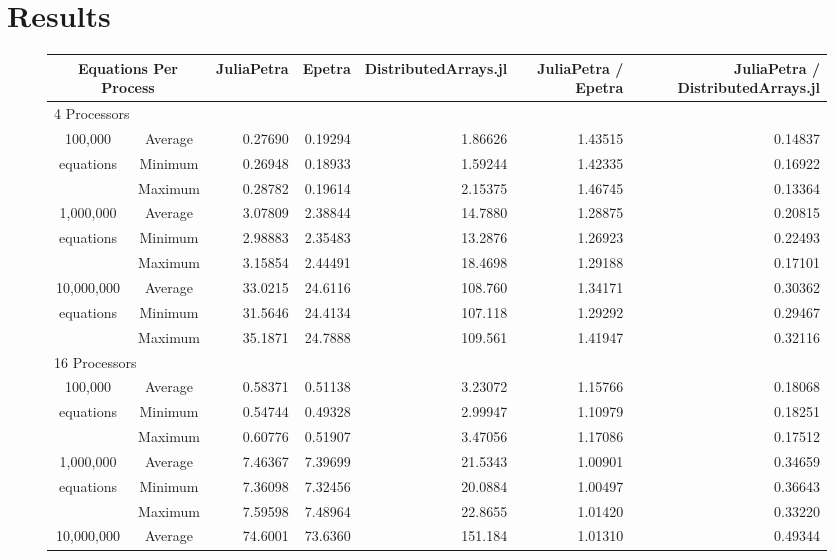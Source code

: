 \documentclass[acmsmall]{acmart}
\begin{document}
\section{Results}

\begin{figure}
\begin{tabular}{|c c|r|r|r||r|r|}
	\hline
		\multicolumn{2}{|c|}{Equations Per Process}
		& JuliaPetra
		& Epetra
		& \multicolumn{1}{m{1.8cm}||}{Distributed\-Arrays.jl}
		& \multicolumn{1}{m{1.75cm}|}{JuliaPetra / Epetra}
		& \multicolumn{1}{m{1.8cm}|}{JuliaPetra / Distributed\-Arrays.jl} \\
	\hline
		\multicolumn{7}{|l|}{4 Processors}\\
	\hline
		100,000			&Average & 0.27690 & 0.19294 & 1.86626 & 1.43515 & 0.14837 \\
		equations		&Minimum & 0.26948 & 0.18933 & 1.59244 & 1.42335 & 0.16922 \\
						&Maximum & 0.28782 & 0.19614 & 2.15375 & 1.46745 & 0.13364 \\
	\hline
		1,000,000		&Average & 3.07809 & 2.38844 & 14.7880 & 1.28875 & 0.20815 \\
		equations		&Minimum & 2.98883 & 2.35483 & 13.2876 & 1.26923 & 0.22493 \\
						&Maximum & 3.15854 & 2.44491 & 18.4698 & 1.29188 & 0.17101 \\
	\hline
		10,000,000		&Average & 33.0215 & 24.6116 & 108.760 & 1.34171 & 0.30362 \\
		equations		&Minimum & 31.5646 & 24.4134 & 107.118 & 1.29292 & 0.29467 \\
						&Maximum & 35.1871 & 24.7888 & 109.561 & 1.41947 & 0.32116 \\
	\hline
		\multicolumn{7}{|l|}{16 Processors}\\
	\hline
		100,000			&Average & 0.58371 & 0.51138 & 3.23072 & 1.15766 & 0.18068 \\
		equations		&Minimum & 0.54744 & 0.49328 & 2.99947 & 1.10979 & 0.18251 \\
						&Maximum & 0.60776 & 0.51907 & 3.47056 & 1.17086 & 0.17512 \\
	\hline
		1,000,000		&Average & 7.46367 & 7.39699 & 21.5343 & 1.00901 & 0.34659 \\
		equations		&Minimum & 7.36098 & 7.32456 & 20.0884 & 1.00497 & 0.36643 \\
						&Maximum & 7.59598 & 7.48964 & 22.8655 & 1.01420 & 0.33220 \\
	\hline
		10,000,000		&Average & 74.6001 & 73.6360 & 151.184 & 1.01310 & 0.49344 \\

\end{tabular}
\end{figure}
\end{document}
